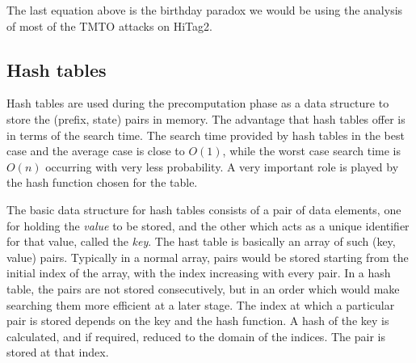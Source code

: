 The last equation above is the birthday paradox we would be using the analysis of most of the TMTO attacks on HiTag2.








\subsection{Hash tables}
\label{sec:hash-tables}


Hash tables are used during the precomputation phase as a data structure to store the (prefix, state) pairs in memory. The advantage that hash tables offer is in terms of the search time. The search time provided by hash tables in the best case and the average case is close to $O(1)$, while the worst case search time is $O(n)$ occurring with very less probability. A very important role is played by the hash function chosen for the table. 

The basic data structure for hash tables consists of a pair of data elements, one for holding the \emph{value} to be stored, and the other which acts as a unique identifier for that value, called the \emph{key}. The hast table is basically an array of such (key, value) pairs. Typically in a normal array, pairs would be stored starting from the initial index of the array, with the index increasing with every pair. In a hash table, the pairs are not stored consecutively, but in an order which would make searching them more efficient at a later stage. The index at which a particular pair is stored depends on the key and the hash function. A hash of the key is calculated, and if required, reduced to the domain of the indices. The pair is stored at that index. 

